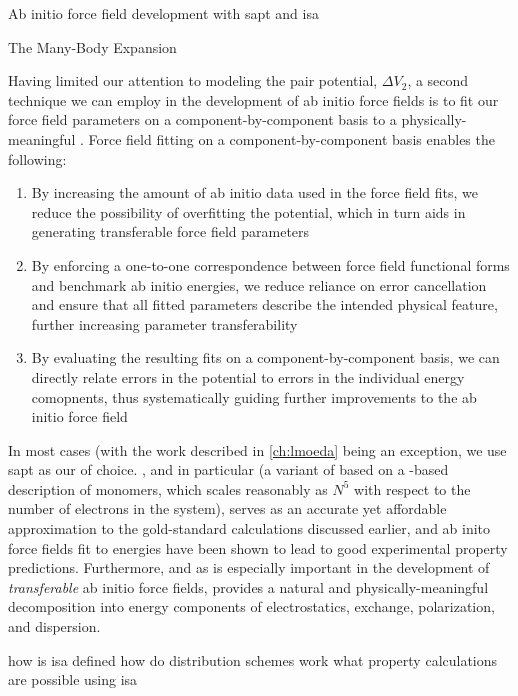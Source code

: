 \begin{section}{Ab initio force field development with \acrshort{sapt} and
\acrshort{isa}}
\begin{subsection}{The Many-Body Expansion}
\end{subsection}

\begin{subsection}{\sapt}
\label{sec:intro-sapt}

Having limited our attention to modeling the pair potential,  $\Delta V_2$,
a second technique we can employ in the development of ab initio force fields is
to fit our force field parameters on a component-by-component basis to a
physically-meaningful \eda. Force field fitting on a component-by-component
basis enables the following:
\begin{enumerate}
\item By increasing the amount of ab initio data used in the force field fits,
we reduce the possibility of overfitting the potential, which in turn aids in
generating transferable force field parameters\cite{Schmidt2015}
\item By enforcing a one-to-one correspondence between force field functional
forms and benchmark ab initio energies, we reduce reliance on error
cancellation and ensure that all fitted parameters describe the intended physical
feature, further increasing parameter transferability
\item By evaluating the resulting fits on a component-by-component basis, we
can directly relate errors in the potential to errors in the individual energy
comopnents, thus systematically guiding further improvements to the ab initio
force field
\end{enumerate}

In most cases (with the work described in \cref{ch:lmoeda} being an exception,
we use \acrfull{sapt} as our \eda of choice. \sapt, and \dftsapt in particular
(a variant of \sapt based on a \dft-based description of monomers, which
scales reasonably as $N^5$ with respect to the number of electrons in the
system), serves as an accurate yet affordable approximation to the
gold-standard \ccsdt calculations discussed earlier, and ab inito force fields
fit to \dftsapt energies have been shown to lead to good experimental property
predictions.
\cite{McDaniel2016a,McDaniel2013}
Furthermore, and as is especially important in the development of
\emph{transferable} ab initio force fields, \sapt provides a natural and
physically-meaningful decomposition into energy components of electrostatics,
exchange, polarization, and dispersion.

\end{subsection}

\begin{subsection}{\isa}
\label{sec:intro-isa}

how is isa defined
how do distribution schemes work
what property calculations are possible using isa

\end{subsection}


\end{section}
